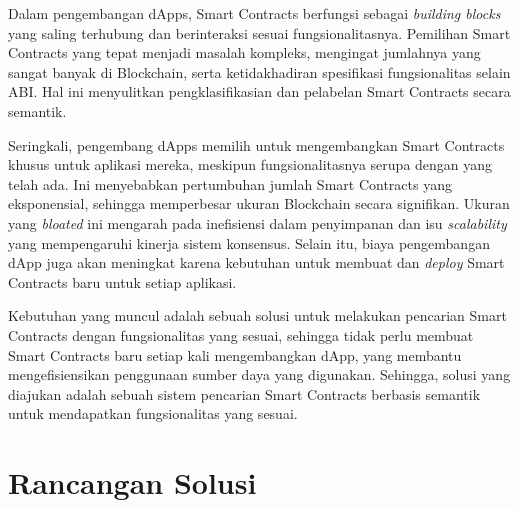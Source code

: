 
Dalam pengembangan dApps, Smart Contracts berfungsi sebagai \textit{building blocks} yang saling terhubung dan berinteraksi sesuai fungsionalitasnya. Pemilihan Smart Contracts yang tepat menjadi masalah kompleks, mengingat jumlahnya yang sangat banyak di Blockchain, serta ketidakhadiran spesifikasi fungsionalitas selain ABI. Hal ini menyulitkan pengklasifikasian dan pelabelan Smart Contracts secara semantik. 

Seringkali, pengembang dApps memilih untuk mengembangkan Smart Contracts khusus untuk aplikasi mereka, meskipun fungsionalitasnya serupa dengan yang telah ada. Ini menyebabkan pertumbuhan jumlah Smart Contracts yang eksponensial, sehingga memperbesar ukuran Blockchain secara signifikan. Ukuran yang \textit{bloated} ini mengarah pada inefisiensi dalam penyimpanan dan isu \textit{scalability} yang mempengaruhi kinerja sistem konsensus. Selain itu, biaya pengembangan dApp juga akan meningkat karena kebutuhan untuk membuat dan \textit{deploy} Smart Contracts baru untuk setiap aplikasi.


Kebutuhan yang muncul adalah sebuah solusi untuk melakukan pencarian Smart Contracts dengan fungsionalitas yang sesuai, sehingga tidak perlu membuat Smart Contracts baru setiap kali mengembangkan dApp, yang membantu mengefisiensikan penggunaan sumber daya yang digunakan. Sehingga, solusi yang diajukan adalah sebuah sistem pencarian Smart Contracts berbasis semantik untuk mendapatkan fungsionalitas yang sesuai.



\section{Rancangan Solusi}




